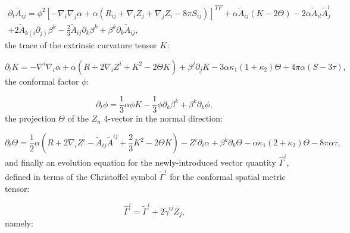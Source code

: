 \documentclass{article}
\begin{document}
\begin{multline}
\partial_t \tilde{A}_{i j} = \phi^2 \left[ - \nabla_i \nabla_j \alpha + \alpha \left( R_{i j} + \nabla_i Z_j + \nabla_j Z_i - 8 \pi S_{i j} \right) \right]^{TF} + \alpha \tilde{A}_{i j} \left( K - 2 \Theta \right) - 2 \alpha \tilde{A}_{i l} \tilde{A}_{j}^{l}\\
+ 2 \tilde{A}_{k \left( i \right.} \partial_{\left. j \right)} \beta^k - \frac{2}{3} \tilde{A}_{i j} \partial_k \beta^k + \beta^k \partial_k \tilde{A}_{i j},
\end{multline}
the trace of the extrinsic curvature tensor $K$:

\begin{equation}
\partial_t K = - \nabla^i \nabla_i \alpha + \alpha \left( R + 2 \nabla_i Z^i + K^2 - 2 \Theta K \right) + \beta^j \partial_j K - 3 \alpha \kappa_1 \left( 1 + \kappa_2 \right) \Theta + 4 \pi \alpha \left( S - 3 \tau \right),
\end{equation}
the conformal factor ${\phi}$:

\begin{equation}
\partial_t \phi = \frac{1}{3} \alpha \phi K - \frac{1}{3} \phi \partial_k \beta^k + \beta^k \partial_k \phi,
\end{equation}
the projection ${\Theta}$ of the ${Z_n}$ 4-vector in the normal direction:

\begin{equation}
\partial_t \Theta = \frac{1}{2} \alpha \left( R + 2 \nabla_i Z^i - \tilde{A}_{i j} \tilde{A}^{i j} + \frac{2}{3} K^2 - 2 \Theta K \right) - Z^i \partial_i \alpha + \beta^k \partial_k \Theta - \alpha \kappa_1 \left( 2 + \kappa_2 \right) \Theta - 8 \pi \alpha \tau,
\end{equation}
and finally an evolution equation for the newly-introduced vector quantity ${\hat{\Gamma}^i}$, defined in terms of the Christoffel symbol ${\tilde{\Gamma}^i}$ for the conformal spatial metric tensor:

\begin{equation}
\hat{\Gamma}^i = \tilde{\Gamma}^i + 2 \tilde{\gamma}^{i j} Z_j,
\end{equation}
namely:
\end{document}
